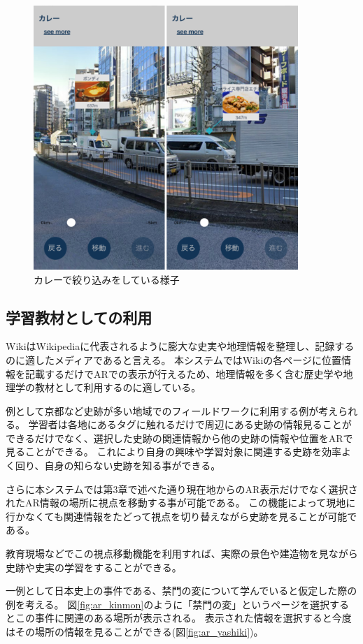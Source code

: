 \begin{figure}[H]
  \centering
  \includegraphics[width=100mm]{images/ar_navigation_jibotyo_link.png}
  \caption{カレーで絞り込みをしている様子} \label{fig:ar_navigation_jibotyo_link}
\end{figure}


\subsection{学習教材としての利用}
WikiはWikipediaに代表されるように膨大な史実や地理情報を整理し、記録するのに適したメディアであると言える。
本システムではWikiの各ページに位置情報を記載するだけでARでの表示が行えるため、地理情報を多く含む歴史学や地理学の教材として利用するのに適している。

例として京都など史跡が多い地域でのフィールドワークに利用する例が考えられる。
学習者は各地にあるタグに触れるだけで周辺にある史跡の情報見ることができるだけでなく、選択した史跡の関連情報から他の史跡の情報や位置をARで見ることができる。
これにより自身の興味や学習対象に関連する史跡を効率よく回り、自身の知らない史跡を知る事ができる。

さらに本システムでは第3章で述べた通り現在地からのAR表示だけでなく選択されたAR情報の場所に視点を移動する事が可能である。
この機能によって現地に行かなくても関連情報をたどって視点を切り替えながら史跡を見ることが可能である。

教育現場などでこの視点移動機能を利用すれば、実際の景色や建造物を見ながら史跡や史実の学習をすることができる。

一例として日本史上の事件である、禁門の変について学んでいると仮定した際の例を考える。
図\ref{fig:ar_kinmon}のように「禁門の変」というページを選択するとこの事件に関連のある場所が表示される。
表示された情報を選択すると今度はその場所の情報を見ることができる(図\ref{fig:ar_yashiki})。


